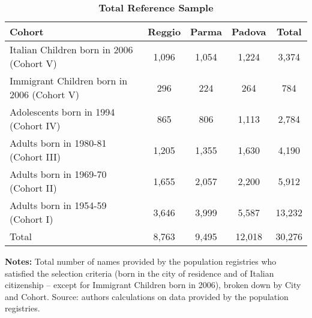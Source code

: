 \begin{table}[ht!]
\caption{\textbf{\small Total Reference Sample}}
\label{tab:TotRefSample}
\begin{center}
\scriptsize
\begin{tabular}{ l c c c c }
\hline\hline
\textbf{Cohort} & \textbf{Reggio} & \textbf{Parma} & \textbf{Padova} & \textbf{Total}\\
\hline
Italian Children born in 2006 (Cohort V)   & 1,096 & 1,054 & 1,224 & 3,374\\[0.2em]
Immigrant Children born in 2006 (Cohort V) &   296 &   224 &   264 &   784\\[0.2em]
Adolescents born in 1994 (Cohort IV)       &   865 &   806 & 1,113 & 2,784\\[0.2em]
Adults born in 1980-81 (Cohort III)        & 1,205 & 1,355 & 1,630 & 4,190\\[0.2em]
Adults born in 1969-70 (Cohort II)         & 1,655 & 2,057 & 2,200 & 5,912\\[0.2em]
Adults born in 1954-59 (Cohort I)          & 3,646 & 3,999 & 5,587 & 13,232\\[0.2em]
\hline
Total                                      & 8,763 & 9,495 & 12,018 & 30,276\\
\hline
\end{tabular}
\end{center}
\begin{flushleft}
\tiny{{\bfseries Notes:} Total number of names provided by the population registries who satisfied the selection criteria (born in the city of residence and of Italian citizenship -- except for Immigrant Children born in 2006), broken down by City and Cohort. Source: authors calculations on data provided by the population registries.}
\end{flushleft}
\end{table} 
